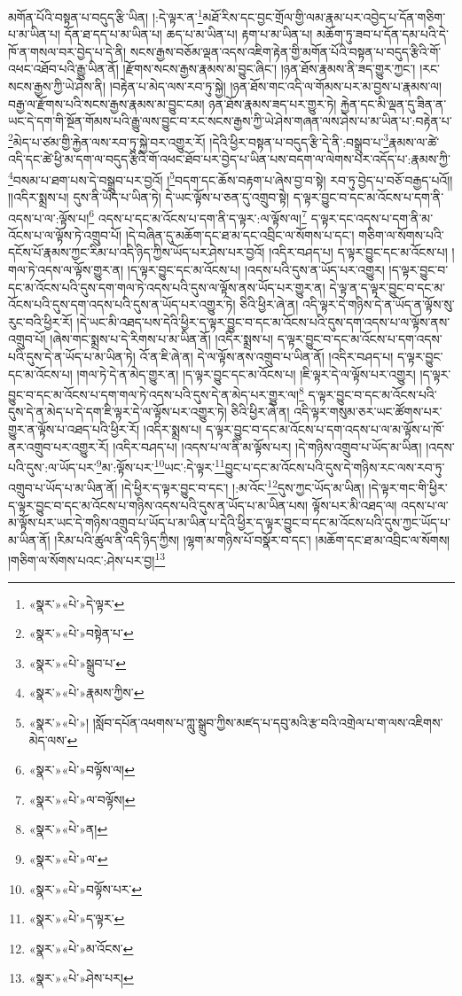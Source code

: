 མགོན་པོའི་བསྟན་པ་བདུད་རྩི་ཡིན། །:དེ་ལྟར་ན་\footnote{«སྣར་»«པེ་»དེ་ལྟར་}མཐོ་རིས་དང་བྱང་གྲོལ་གྱི་ལམ་རྣམ་པར་འབྱེད་པ་དོན་གཅིག་པ་མ་ཡིན་པ། དོན་ཐ་དད་པ་མ་ཡིན་པ། ཆད་པ་མ་ཡིན་པ། རྟག་པ་མ་ཡིན་པ། མཆོག་ཏུ་ཟབ་པ་དོན་དམ་པའི་དེ་ཁོ་ན་གསལ་བར་བྱེད་པ་དེ་ནི། སངས་རྒྱས་བཅོམ་ལྡན་འདས་འཇིག་རྟེན་གྱི་མགོན་པོའི་བསྟན་པ་བདུད་རྩིའི་གོ་འཕང་འཐོབ་པའི་རྒྱུ་ཡིན་ནོ། །རྫོགས་སངས་རྒྱས་རྣམས་མ་བྱུང་ཞིང་། །ཉན་ཐོས་རྣམས་ནི་ཟད་གྱུར་ཀྱང་། །རང་སངས་རྒྱས་ཀྱི་ཡེ་ཤེས་ནི། །བརྟེན་པ་མེད་ལས་རབ་ཏུ་སྐྱེ། །ཉན་ཐོས་གང་འདི་ལ་གོམས་པར་མ་བྱས་པ་རྣམས་ལ། བརྒྱ་ལ་རྫོགས་པའི་སངས་རྒྱས་རྣམས་མ་བྱུང་ངམ། ཉན་ཐོས་རྣམས་ཟད་པར་གྱུར་ཏེ། རྐྱེན་དང་མི་ལྡན་དུ་ཟིན་ན་ཡང་དེ་དག་གི་སྔོན་གོམས་པའི་རྒྱུ་ལས་བྱུང་བ་རང་སངས་རྒྱས་ཀྱི་ཡེ་ཤེས་གཞན་ལས་ཤེས་པ་མ་ཡིན་པ་:བརྟེན་པ་\footnote{«སྣར་»«པེ་»བསྟེན་པ་}མེད་པ་ཙམ་གྱི་རྐྱེན་ལས་རབ་ཏུ་སྐྱེ་བར་འགྱུར་རོ། །དེའི་ཕྱིར་བསྟན་པ་བདུད་རྩི་དེ་ནི་:བསྒྲུབ་པ་\footnote{«སྣར་»«པེ་»སྒྲུབ་པ་}རྣམས་ལ་ཚེ་འདི་དང་ཚེ་ཕྱི་མ་དག་ལ་བདུད་རྩིའི་གོ་འཕང་ཐོབ་པར་བྱེད་པ་ཡིན་པས་བདག་ལ་ལེགས་པར་འདོད་པ་:རྣམས་ཀྱི་\footnote{«སྣར་»«པེ་»རྣམས་ཀྱིས་}བསམ་པ་ཐག་པས་དེ་བསྒྲུབ་པར་བྱའོ། །\footnote{«སྣར་»«པེ་»། །སློབ་དཔོན་འཕགས་པ་ཀླུ་སྒྲུབ་ཀྱིས་མཛད་པ་དབུ་མའི་རྩ་བའི་འགྲེལ་པ་ག་ལས་འཇིགས་མེད་ལས་}བདག་དང་ཆོས་བརྟག་པ་ཞེས་བྱ་བ་སྟེ། རབ་ཏུ་བྱེད་པ་བཅོ་བརྒྱད་པའོ།། །།འདིར་སྨྲས་པ། དུས་ནི་ཡོད་པ་ཡིན་ཏེ། དེ་ཡང་ལྟོས་པ་ཅན་དུ་འགྲུབ་སྟེ། ད་ལྟར་བྱུང་བ་དང་མ་འོངས་པ་དག་ནི་འདས་པ་ལ་:ལྟོས་པ།\footnote{«སྣར་»«པེ་»བལྟོས་ལ།} འདས་པ་དང་མ་འོངས་པ་དག་ནི་ད་ལྟར་:ལ་ལྟོས་ལ།\footnote{«སྣར་»«པེ་»ལ་བལྟོས།} ད་ལྟར་དང་འདས་པ་དག་ནི་མ་འོངས་པ་ལ་ལྟོས་ཏེ་འགྲུབ་པོ། །དེ་བཞིན་དུ་མཆོག་དང་ཐ་མ་དང་འབྲིང་ལ་སོགས་པ་དང་། གཅིག་ལ་སོགས་པའི་དངོས་པོ་རྣམས་ཀྱང་རིམ་པ་འདི་ཉིད་ཀྱིས་ཡོད་པར་ཤེས་པར་བྱའོ། །འདིར་བཤད་པ། ད་ལྟར་བྱུང་དང་མ་འོངས་པ། །གལ་ཏེ་འདས་ལ་ལྟོས་གྱུར་ན། །ད་ལྟར་བྱུང་དང་མ་འོངས་པ། །འདས་པའི་དུས་ན་ཡོད་པར་འགྱུར། །ད་ལྟར་བྱུང་བ་དང་མ་འོངས་པའི་དུས་དག་གལ་ཏེ་འདས་པའི་དུས་ལ་ལྟོས་ནས་ཡོད་པར་གྱུར་ན། དེ་ལྟ་ན་ད་ལྟར་བྱུང་བ་དང་མ་འོངས་པའི་དུས་དག་འདས་པའི་དུས་ན་ཡོད་པར་འགྱུར་ཏེ། ཅིའི་ཕྱིར་ཞེ་ན། འདི་ལྟར་དེ་གཉིས་དེ་ན་ཡོད་ན་ལྟོས་སུ་རུང་བའི་ཕྱིར་རོ། །དེ་ཡང་མི་འཐད་པས་དེའི་ཕྱིར་ད་ལྟར་བྱུང་བ་དང་མ་འོངས་པའི་དུས་དག་འདས་པ་ལ་ལྟོས་ནས་འགྲུབ་པོ། །ཞེས་གང་སྨྲས་པ་དེ་རིགས་པ་མ་ཡིན་ནོ། །འདིར་སྨྲས་པ། ད་ལྟར་བྱུང་བ་དང་མ་འོངས་པ་དག་འདས་པའི་དུས་དེ་ན་ཡོད་པ་མ་ཡིན་ཏེ། འོ་ན་ཇི་ཞེ་ན། དེ་ལ་ལྟོས་ནས་འགྲུབ་པ་ཡིན་ནོ། །འདིར་བཤད་པ། ད་ལྟར་བྱུང་དང་མ་འོངས་པ། །གལ་ཏེ་དེ་ན་མེད་གྱུར་ན། །ད་ལྟར་བྱུང་དང་མ་འོངས་པ། །ཇི་ལྟར་དེ་ལ་ལྟོས་པར་འགྱུར། །ད་ལྟར་བྱུང་བ་དང་མ་འོངས་པ་དག་གལ་ཏེ་འདས་པའི་དུས་དེ་ན་མེད་པར་གྱུར་ལ།\footnote{«སྣར་»«པེ་»ན།} ད་ལྟར་བྱུང་བ་དང་མ་འོངས་པའི་དུས་དེ་ན་མེད་པ་དེ་དག་ཇི་ལྟར་དེ་ལ་ལྟོས་པར་འགྱུར་ཏེ། ཅིའི་ཕྱིར་ཞེ་ན། འདི་ལྟར་གསུམ་ཅར་ཡང་ཚོགས་པར་གྱུར་ན་ལྟོས་པ་འཐད་པའི་ཕྱིར་རོ། །འདིར་སྨྲས་པ། ད་ལྟར་བྱུང་བ་དང་མ་འོངས་པ་དག་འདས་པ་ལ་མ་ལྟོས་པ་ཁོ་ནར་འགྲུབ་པར་འགྱུར་རོ། །འདིར་བཤད་པ། །འདས་པ་ལ་ནི་མ་ལྟོས་པར། །དེ་གཉིས་འགྲུབ་པ་ཡོད་མ་ཡིན། །འདས་པའི་དུས་:ལ་ཡོད་པར་\footnote{«སྣར་»«པེ་»ལ་}མ་:ལྟོས་པར་\footnote{«སྣར་»«པེ་»བལྟོས་པར་}ཡང་:དེ་ལྟར་\footnote{«སྣར་»«པེ་»ད་ལྟར་}བྱུང་པ་དང་མ་འོངས་པའི་དུས་དེ་གཉིས་རང་ལས་རབ་ཏུ་འགྲུབ་པ་ཡོད་པ་མ་ཡིན་ནོ། །དེ་ཕྱིར་ད་ལྟར་བྱུང་བ་དང་། །:མ་འོང་\footnote{«སྣར་»«པེ་»མ་འོངས་}དུས་ཀྱང་ཡོད་མ་ཡིན། །དེ་ལྟར་གང་གི་ཕྱིར་ད་ལྟར་བྱུང་བ་དང་མ་འོངས་པ་གཉིས་འདས་པའི་དུས་ན་ཡོད་པ་མ་ཡིན་པས། ལྟོས་པར་མི་འཐད་ལ། འདས་པ་ལ་མ་ལྟོས་པར་ཡང་དེ་གཉིས་འགྲུབ་པ་ཡོད་པ་མ་ཡིན་པ་དེའི་ཕྱིར་ད་ལྟར་བྱུང་བ་དང་མ་འོངས་པའི་དུས་ཀྱང་ཡོད་པ་མ་ཡིན་ནོ། །རིམ་པའི་ཚུལ་ནི་འདི་ཉིད་ཀྱིས། །ལྷག་མ་གཉིས་པོ་བསྣོར་བ་དང་། །མཆོག་དང་ཐ་མ་འབྲིང་ལ་སོགས། །གཅིག་ལ་སོགས་པའང་:ཤེས་པར་བྱ།\footnote{«སྣར་»«པེ་»ཤེས་པར།} 